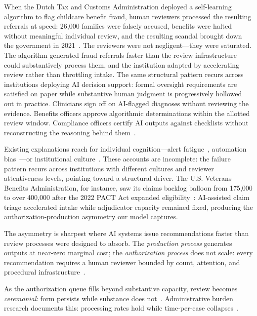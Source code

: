 \documentclass[runningheads]{llncs}
\begin{document}
When the Dutch Tax and Customs Administration deployed a self-learning algorithm
to flag childcare benefit fraud, human reviewers processed the resulting referrals
at speed: 26,000 families were falsely accused, benefits were halted without
meaningful individual review, and the resulting scandal brought down the
government in 2021~\cite{amnesty2021}. The reviewers were not negligent---they
were saturated. The algorithm generated fraud referrals faster than the review
infrastructure could substantively process them, and the institution adapted by
accelerating review rather than throttling intake. The same structural pattern
recurs across institutions deploying AI decision support: formal oversight
requirements are satisfied on paper while substantive human judgment is
progressively hollowed out in practice. Clinicians sign off on AI-flagged
diagnoses without reviewing the evidence. Benefits officers approve algorithmic
determinations within the allotted review window. Compliance officers certify AI
outputs against checklists without reconstructing the reasoning behind
them~\cite{green2022,elish2019}.

Existing explanations reach for individual cognition---alert fatigue~\cite{parasuraman1997},
automation bias~\cite{bainbridge1983}---or institutional culture~\cite{power1997}. These
accounts are incomplete: the failure pattern recurs across institutions with
different cultures and reviewer attentiveness levels, pointing toward a structural
driver. The U.S. Veterans Benefits Administration, for instance, saw its claims
backlog balloon from 175,000 to over 400,000 after the 2022 PACT Act expanded
eligibility~\cite{va2024}: AI-assisted claim triage accelerated intake while
adjudicator capacity remained fixed, producing the
authorization-production asymmetry our model captures.

The asymmetry is sharpest where AI systems issue recommendations faster
than review processes were designed to absorb. The \emph{production process} generates
outputs at near-zero marginal cost; the \emph{authorization process} does not scale:
every recommendation requires a human reviewer bounded by count, attention, and
procedural infrastructure~\cite{luhmann1969,bovens2007}.

As the authorization queue fills beyond substantive capacity, review becomes
\emph{ceremonial}: form persists while substance does
not~\cite{meyer1977,power1997}.
Administrative burden research documents this: processing rates hold while
time-per-case collapses~\cite{herd2018}.
\end{document}
